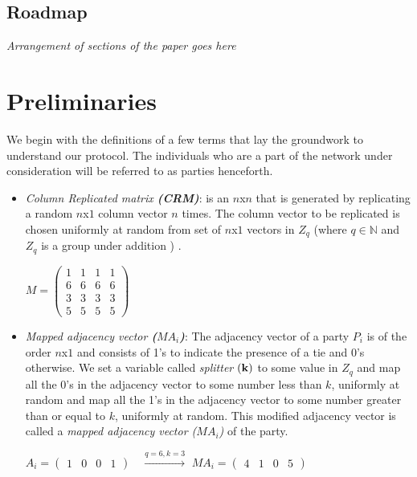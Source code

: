 \documentclass{llncs}
\begin{document}
\subsection{Roadmap}
\emph{Arrangement of sections of the paper goes here}


\section{Preliminaries}
We begin with the definitions of a few terms that lay the groundwork to understand our protocol. The individuals who are a part of the network under consideration will be referred to as parties henceforth.
\begin{itemize}
\item \emph{Column Replicated matrix \bf(CRM)}: is an $n$x$n$ that is generated by replicating a random $n$x$1$ column vector $n$ times. The column vector to be replicated is chosen uniformly at random from set of $n$x$1$ vectors in $Z_q$ (where $q \in \mathbb{N}$ and $Z_q$ is a group under addition )  . \begin{center}
$
M=
  \begin{pmatrix}
    1 & 1 & 1 & 1  \\
    6 & 6 & 6 & 6  \\
    3 & 3 & 3 & 3  \\
    5 & 5 & 5 & 5
  \end{pmatrix}
  $

\end{center}

\item \emph{Mapped adjacency vector \bf($MA_i$)}: The adjacency vector of a  party $P_i$ is of the order $n$x$1$ and consists of 1's to indicate the presence of a tie and 0's otherwise. We set a variable called \emph{splitter} $\bf(k)$ to some value in $Z_q$ and map all the 0's in the adjacency vector to some number less than $k$, uniformly at random	 and map all the 1's in the adjacency vector to some number greater than or equal to $k$, uniformly at random. This modified adjacency vector is called a \emph{mapped adjacency vector ($MA_i$)} of the party. 
\begin{center}
$
A_i=
  \begin{pmatrix}
    1 & 0 & 0 & 1  
  \end{pmatrix}
  $
  $
\ \ \ \xrightarrow{q=6,k=3}
  $
\hspace{.5cm}
$
MA_i=
  \begin{pmatrix}
    4 & 1 & 0 & 5  
  \end{pmatrix}
  $


\end{center}
\end{itemize}
\end{document}

